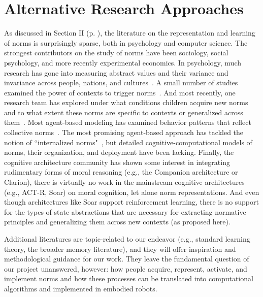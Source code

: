 \documentclass[12pt]{article}
\begin{document}
\section*{Alternative Research Approaches}

As discussed in Section II (p. \pageref{sec:OtherResearch}), the literature on the representation and learning of norms is surprisingly sparse, both in psychology and computer science.  The strongest contributors on the study of norms have been sociology, social psychology, and more recently experimental economics.  In psychology, much research has gone into measuring abstract values and their variance and invariance across people, nations, and cultures~\citep{schwartz92}.  A small number of studies examined the power of contexts to trigger norms~\citep{harvey81,aarts03}.  And most recently, one research team has explored under what conditions children acquire new norms and to what extent these norms are specific to contexts or generalized across them~\citep{wyman09,rakoczy08}.  Most agent-based modeling has examined behavior patterns that reflect collective norms~\citep{centola05,elsenbroich14}. The most promising agent-based approach has tackled the notion of ``internalized norms"~\citep{andrigh10}, but detailed cognitive-computational models of norms, their organization, and deployment have been lacking. Finally, the cognitive architecture community has shown some interest in integrating rudimentary forms of moral reasoning (e.g., the Companion
architecture \cite{blass15} or Clarion\cite{Licatoetal14}), there is virtually no work in the mainstream
cognitive architectures (e.g., ACT-R, Soar) on moral cognition, let alone norm representations.  And
even though architectures like Soar support reinforcement learning, there is no support for the types of state abstractions that are necessary for extracting normative principles and generalizing them
across new contexts (as proposed here).  

Additional literatures are topic-related to our endeavor (e.g., standard learning theory, the broader memory literature), and they will offer inspiration and methodological guidance for our work.  They leave the fundamental question of our project unanswered, however: how people acquire, represent, activate, and implement norms and how these processes can be translated into computational algorithms and implemented in embodied robots.

\end{document}
